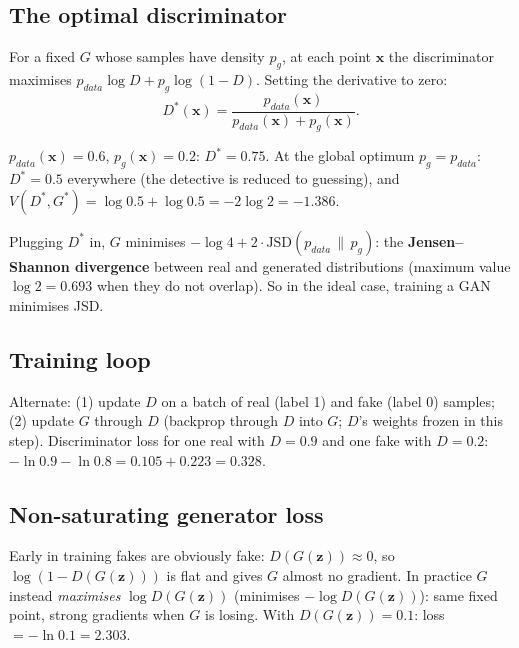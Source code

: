 \subsection{The optimal discriminator}
For a fixed $G$ whose samples have density $p_g$, at each point $\mathbf x$ the discriminator maximises $p_{data}\log D + p_g\log(1 - D)$. Setting the derivative to zero:
\[ D^*(\mathbf x) = \frac{p_{data}(\mathbf x)}{p_{data}(\mathbf x) + p_g(\mathbf x)}. \]
\begin{example}
$p_{data}(\mathbf x) = 0.6$, $p_g(\mathbf x) = 0.2$: $D^* = 0.75$. At the global optimum $p_g = p_{data}$: $D^* = 0.5$ everywhere (the detective is reduced to guessing), and
$V(D^*, G^*) = \log0.5 + \log0.5 = -2\log2 = -1.386$.
\end{example}
Plugging $D^*$ in, $G$ minimises $-\log4 + 2\cdot\text{JSD}(p_{data}\,\|\,p_g)$: the \textbf{Jensen--Shannon divergence} between real and generated distributions
(maximum value $\log2 = 0.693$ when they do not overlap). So in the ideal case, training a GAN minimises JSD.

\subsection{Training loop}
Alternate: (1) update $D$ on a batch of real (label 1) and fake (label 0) samples; (2) update $G$ through $D$ (backprop through $D$ into $G$; $D$'s weights frozen in this
step). Discriminator loss for one real with $D = 0.9$ and one fake with $D = 0.2$: $-\ln0.9 - \ln0.8 = 0.105 + 0.223 = 0.328$.

\subsection{Non-saturating generator loss}
Early in training fakes are obviously fake: $D(G(\mathbf z))\approx0$, so $\log(1 - D(G(\mathbf z)))$ is flat and gives $G$ almost no gradient. In practice $G$ instead
\emph{maximises} $\log D(G(\mathbf z))$ (minimises $-\log D(G(\mathbf z))$): same fixed point, strong gradients when $G$ is losing. With $D(G(\mathbf z)) = 0.1$:
loss $= -\ln0.1 = 2.303$.

